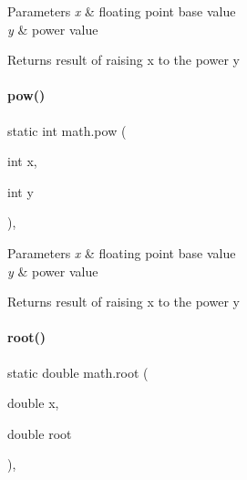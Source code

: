 \begin{DoxyParams}{Parameters}
{\em x} & floating point base value \\
\hline
{\em y} & power value \\
\hline
\end{DoxyParams}
\begin{DoxyReturn}{Returns}
result of raising x to the power y 
\end{DoxyReturn}
\mbox{\label{classmath_a4d0742d73c59ffd903e3dcb50744c328}} 
\paragraph{\texorpdfstring{pow()}{pow()}\hspace{0.1cm}{\footnotesize\ttfamily [2/2]}}
{\footnotesize\ttfamily static int math.\+pow (\begin{DoxyParamCaption}\item[{int}]{x,  }\item[{int}]{y }\end{DoxyParamCaption})\hspace{0.3cm}{\ttfamily [inline]}, {\ttfamily [static]}}


\begin{DoxyParams}{Parameters}
{\em x} & floating point base value \\
\hline
{\em y} & power value \\
\hline
\end{DoxyParams}
\begin{DoxyReturn}{Returns}
result of raising x to the power y 
\end{DoxyReturn}
\mbox{\label{classmath_a9bce1ed75fbc2f3d7051c2a47088754b}} 
\paragraph{\texorpdfstring{root()}{root()}}
{\footnotesize\ttfamily static double math.\+root (\begin{DoxyParamCaption}\item[{double}]{x,  }\item[{double}]{root }\end{DoxyParamCaption})\hspace{0.3cm}{\ttfamily [inline]}, {\ttfamily [static]}}



